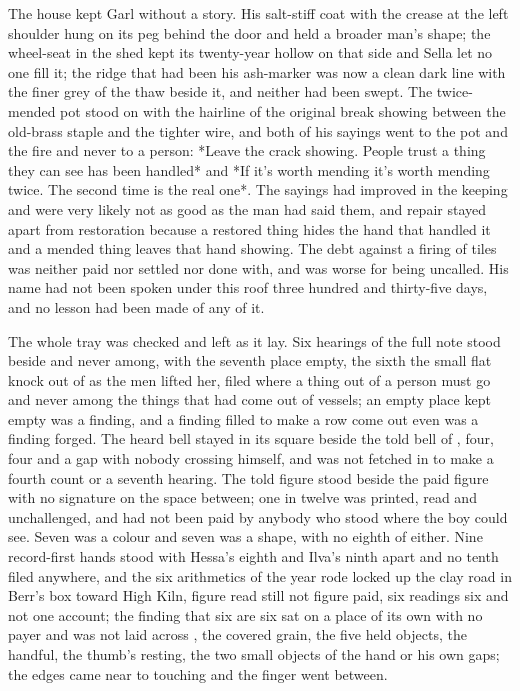 The house kept Garl without a story. His salt-stiff coat with the crease at the left shoulder hung on its peg behind the door and held a broader man's shape; the wheel-seat in the shed kept its twenty-year hollow on that side and Sella let no one fill it; the ridge that had been his ash-marker was now a clean dark line with the finer grey of the thaw beside it, and neither had been swept. The twice-mended pot stood on  with the hairline of the original break showing between the old-brass staple and the tighter wire, and both of his sayings went to the pot and the fire and never to a person: *Leave the crack showing. People trust a thing they can see has been handled* and *If it's worth mending it's worth mending twice. The second time is the real one*. The sayings had improved in the keeping and were very likely not as good as the man had said them, and repair stayed apart from restoration because a restored thing hides the hand that handled it and a mended thing leaves that hand showing. The debt against a firing of tiles was neither paid nor settled nor done with, and was worse for being uncalled. His name had not been spoken under this roof three hundred and thirty-five days, and no lesson had been made of any of it.

The whole tray was checked and left as it lay. Six hearings of the full note stood beside and never among, with the seventh place empty, the sixth the small flat knock out of  as the men lifted her, filed where a thing out of a person must go and never among the things that had come out of vessels; an empty place kept empty was a finding, and a finding filled to make a row come out even was a finding forged. The heard bell stayed in its square beside the told bell of , four, four and a gap with nobody crossing himself, and was not fetched in to make a fourth count or a seventh hearing. The told figure stood beside the paid figure with no signature on the space between; one in twelve was printed, read and unchallenged, and had not been paid by anybody who stood where the boy could see. Seven was a colour and seven was a shape, with no eighth of either. Nine record-first hands stood with Hessa's eighth and Ilva's ninth apart and no tenth filed anywhere, and the six arithmetics of the year rode locked up the clay road in Berr's box toward High Kiln, figure read still not figure paid, six readings six and not one account; the finding that six are six sat on a place of its own with no payer and was not laid across , the covered grain, the five held objects, the handful, the thumb's resting, the two small objects of the hand or his own gaps; the edges came near to touching and the finger went between.

